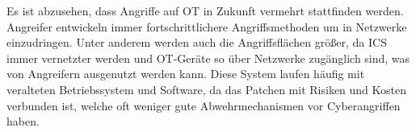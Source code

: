 Es ist abzusehen, dass Angriffe auf OT in Zukunft vermehrt stattfinden werden. Angreifer entwickeln immer fortschrittlichere Angriffsmethoden um in Netzwerke einzudringen. Unter anderem werden auch die Angriffsflächen größer,  da ICS immer vernetzter werden und OT-Geräte so über Netzwerke zugänglich sind, was von Angreifern ausgenutzt werden kann. Diese System laufen häufig mit veralteten Betriebssystem und Software, da das Patchen mit Risiken und Kosten verbunden ist, welche oft weniger gute Abwehrmechanismen vor Cyberangriffen haben. 

